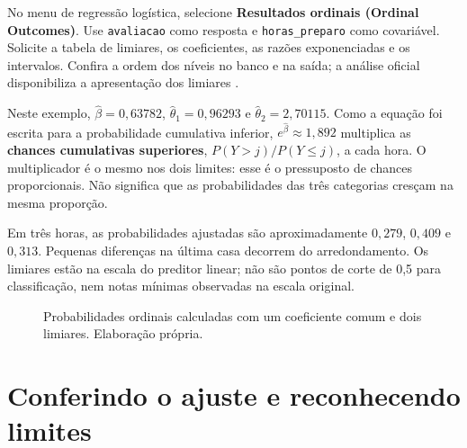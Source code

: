 No menu de regressão logística, selecione \textbf{Resultados ordinais (Ordinal Outcomes)}. Use \texttt{avaliacao} como resposta e \texttt{horas\_preparo} como covariável. Solicite a tabela de limiares, os coeficientes, as razões exponenciadas e os intervalos. Confira a ordem dos níveis no banco e na saída; a análise oficial disponibiliza a apresentação dos limiares \parencite{JamoviOrdinal}.

Neste exemplo, $\hat\beta=0{,}63782$, $\hat\theta_1=0{,}96293$ e $\hat\theta_2=2{,}70115$. Como a equação foi escrita para a probabilidade cumulativa inferior, $e^{\hat\beta}\approx1{,}892$ multiplica as \textbf{chances cumulativas superiores}, $P(Y>j)/P(Y\leq j)$, a cada hora. O multiplicador é o mesmo nos dois limites: esse é o pressuposto de chances proporcionais. Não significa que as probabilidades das três categorias cresçam na mesma proporção.

Em três horas, as probabilidades ajustadas são aproximadamente $0{,}279$, $0{,}409$ e $0{,}313$. Pequenas diferenças na última casa decorrem do arredondamento. Os limiares estão na escala do preditor linear; não são pontos de corte de 0,5 para classificação, nem notas mínimas observadas na escala original.

\begin{figure}[H]
\centering
{}
\caption{Probabilidades ordinais calculadas com um coeficiente comum e dois limiares. Elaboração própria.}
\label{fig:ordinal-probabilidades}
\end{figure}

\section{Conferindo o ajuste e reconhecendo limites}

